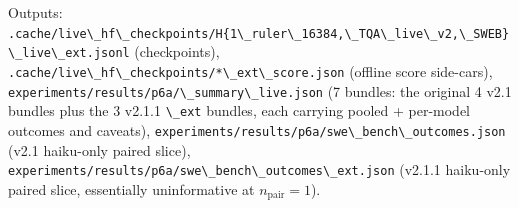 Outputs: \passthrough{\lstinline!.cache/live\_hf\_checkpoints/H\{1\_ruler\_16384,\_TQA\_live\_v2,\_SWEB\}\_live\_ext.jsonl!}
(checkpoints), \passthrough{\lstinline!.cache/live\_hf\_checkpoints/*\_ext\_score.json!}
(offline score side-cars), \passthrough{\lstinline!experiments/results/p6a/\_summary\_live.json!}
(7 bundles: the original 4 v2.1 bundles plus the 3 v2.1.1 \passthrough{\lstinline!\_ext!}
bundles, each carrying pooled + per-model outcomes and caveats),
\passthrough{\lstinline!experiments/results/p6a/swe\_bench\_outcomes.json!}
(v2.1 haiku-only paired slice), \passthrough{\lstinline!experiments/results/p6a/swe\_bench\_outcomes\_ext.json!}
(v2.1.1 haiku-only paired slice, essentially uninformative at $n_\text{pair}=1$).
